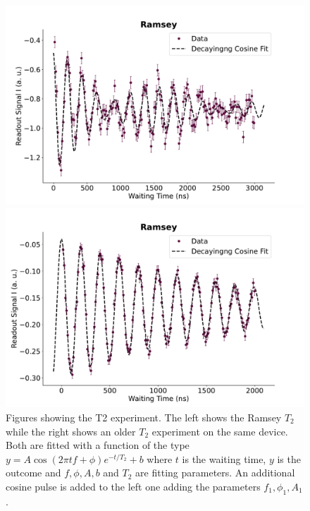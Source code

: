 \begin{figure}[t]
    \begin{minipage}{0.50\linewidth}
        \centering
        \includegraphics[width=1.0\linewidth]{Calibrations/Figures/Ramsey.pdf} %
    \end{minipage}
    \begin{minipage}{0.50\linewidth}
        \centering
        \includegraphics[width = 1.0 \linewidth]{Calibrations/Figures/old_figs/Ramsey.pdf}        
    \end{minipage}
    \caption{Figures showing the T2 experiment. The left shows the Ramsey $T_2$ while the right shows an older $T_2$ experiment on the same device. Both are fitted with a function of the type $y = A \cos(2 \pi t f + \phi) e^{-t / T_2} + b$ where $t$ is the waiting time, $y$ is the outcome and $f, \phi, A, b$ and $T_2$ are fitting parameters. An additional cosine pulse is added to the left one adding the parameters $f_1, \phi_1, A_1$.}
    \label{fig:calibrations_t2}
\end{figure}
